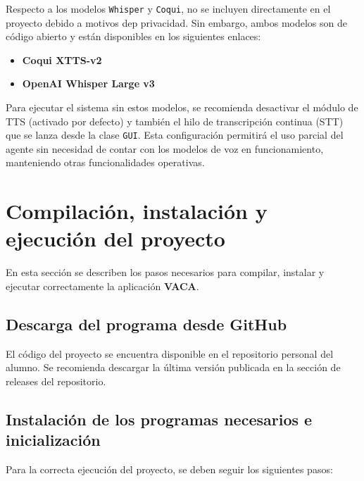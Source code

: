 Respecto a los modelos \texttt{Whisper} y \texttt{Coqui}, no se incluyen directamente en el proyecto debido a motivos dep privacidad. Sin embargo, ambos modelos son de código abierto y están disponibles en los siguientes enlaces:

\begin{itemize}

\item \textbf{Coqui XTTS-v2}\cite{coquiXTTSv2}
\item \textbf{OpenAI Whisper Large v3}\cite{openaiWhisperV3}
\end{itemize}

Para ejecutar el sistema sin estos modelos, se recomienda desactivar el módulo de TTS (activado por defecto) y también el hilo de transcripción continua (STT) que se lanza desde la clase \texttt{GUI}. Esta configuración permitirá el uso parcial del agente sin necesidad de contar con los modelos de voz en funcionamiento, manteniendo otras funcionalidades operativas.





\section{Compilación, instalación y ejecución del proyecto}

En esta sección se describen los pasos necesarios para compilar, instalar y ejecutar correctamente la aplicación \textbf{VACA}.

\subsection{Descarga del programa desde GitHub}

El código del proyecto se encuentra disponible en el repositorio personal del alumno. Se recomienda descargar la última versión publicada en la sección de releases del repositorio.\cite{VACARepo}

\subsection{Instalación de los programas necesarios e inicialización}

Para la correcta ejecución del proyecto, se deben seguir los siguientes pasos:

